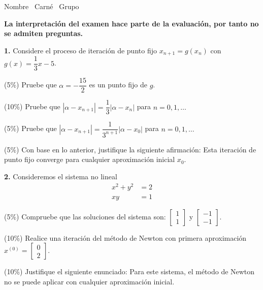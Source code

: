 \documentclass[11pt]{article}
\begin{document}
\examheader

\vspace{6pt}
\noindent Nombre \dotfill\ Carné \dotfill\ Grupo \dotfill

\vspace{8pt}
\noindent\textbf{La interpretación del examen hace parte de la evaluación, por tanto no se admiten preguntas.}

\vspace{10pt}
\noindent\textbf{1.} Considere el proceso de iteración de punto fijo $x_{n+1}=g(x_n)$ con $g(x)=\dfrac{1}{3}x-5$.
\begin{opciones}
\item (5\%) Pruebe que $\alpha=-\dfrac{15}{2}$ es un punto fijo de $g$.
\item (10\%) Pruebe que $|\alpha-x_{n+1}|=\dfrac{1}{3}|\alpha-x_n|$ para $n=0,1,\ldots$
\item (5\%) Pruebe que $|\alpha-x_{n+1}|=\dfrac{1}{3^{n+1}}|\alpha-x_0|$ para $n=0,1,\ldots$
\item (5\%) Con base en lo anterior, justifique la siguiente afirmación: Esta iteración de punto fijo converge para cualquier aproximación inicial $x_0$.
\end{opciones}

\vspace{5mm}
\noindent\textbf{2.} Consideremos el sistema no lineal
\[
\begin{aligned} x^2+y^2&=2\\ xy&=1 \end{aligned}
\]
\begin{opciones}
\item (5\%) Compruebe que las soluciones del sistema son: $\begin{bmatrix}1\\1\end{bmatrix}$ y $\begin{bmatrix}-1\\-1\end{bmatrix}$.
\item (10\%) Realice una iteración del método de Newton con primera aproximación $x^{(0)}=\begin{bmatrix}0\\2\end{bmatrix}$.
\item (10\%) Justifique el siguiente enunciado: Para este sistema, el método de Newton no se puede aplicar con cualquier aproximación inicial.
\end{opciones}
\end{document}

